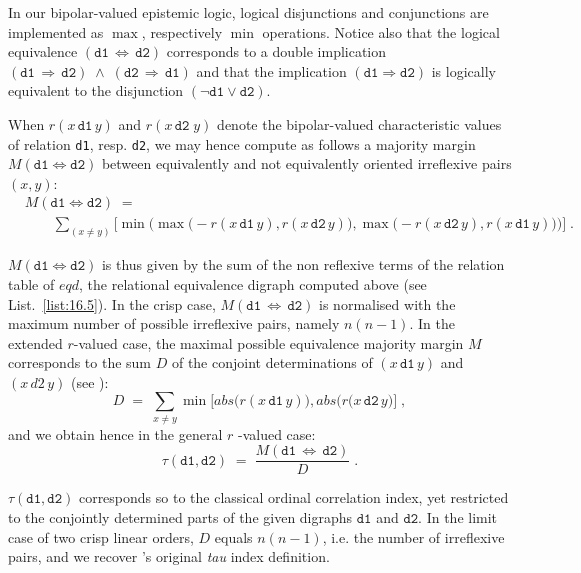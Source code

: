 In our bipolar-valued epistemic logic, logical disjunctions and conjunctions are implemented as $\max$, respectively $\min$ operations. Notice also that the logical equivalence $(\mathtt{d1}\, \Leftrightarrow\, \mathtt{d2})$ corresponds to a double implication $(\mathtt{d1}\, \Rightarrow\, \mathtt{d2})\; \wedge \; (\mathtt{d2}\, \Rightarrow\,  \mathtt{d1})$ and that the implication $(\mathtt{d1} \Rightarrow \mathtt{d2})$ is logically equivalent to the disjunction $(\neg \mathtt{d1} \vee \mathtt{d2})$.

When $r(x\,\mathtt{d1}\, y)$ and $r(x\,\mathtt{d2}\; y)$ denote the bipolar-valued characteristic values of relation \texttt{d1}, resp. \texttt{d2}, we may hence compute as follows a majority margin $M(\mathtt{d1} \Leftrightarrow \mathtt{d2})$ between equivalently and not equivalently oriented irreflexive pairs $(x,y)$:
\begin{equation}\label{eq:16:2}
  \begin{split}
&M(\mathtt{d1} \Leftrightarrow \mathtt{d2}) \; =\\
&\quad \quad \sum_{(x \neq y)} \Big[ \min \Big( \max \big( -r(x \,\mathtt{d1}\, y), r(x \,\mathtt{d2}\, y)\big), \max \big( -r(x \,\mathtt{d2}\, y), r(x \,\mathtt{d1}\, y)\big) \Big) \Big]\;.
\end{split}
\end{equation}

$M(\mathtt{d1} \Leftrightarrow \mathtt{d2})$ is thus given by the sum of the non reflexive terms of the relation table of $eqd$, the relational equivalence digraph computed above (see List.~\vref{list:16.5}). In the crisp case, $M(\mathtt{d1}\,\Leftrightarrow\, \mathtt{d2})$  is normalised with the maximum number of possible irreflexive pairs, namely $n(n-1)$. In the extended $r$-valued case, the maximal possible equivalence majority margin $M$ corresponds to the sum $D$ of the conjoint determinations of $(x \,\mathtt{d1}\, y)$ and $(x \,d2\, y)$ (see \citealp{BIS-2012a}):
\begin{equation}
  D \;=\; \sum_{x \neq y} \min \Big[ abs\big(r(x \,\mathtt{d1}\, y) \big), abs \big( r(x \,\mathtt{d2}\, y \big)  \Big]\;,
\end{equation}
and we obtain hence in the general $r$ -valued case:
\begin{equation}\label{eq:16.4}
  \tau(\mathtt{d1},\mathtt{d2}) \;=\; \frac{M(\mathtt{d1}\,\Leftrightarrow\, \mathtt{d2})}{D}\;.
\end{equation}

$\tau(\mathtt{d1},\mathtt{d2})$ corresponds so to the classical ordinal correlation index, yet restricted to the conjointly determined parts of the given digraphs $\mathtt{d1}$ and $\mathtt{d2}$. In the limit case of two crisp linear orders, $D$ equals $n(n-1)$, i.e. the number of irreflexive pairs, and we recover \Kendall 's original \emph{tau} index definition.

